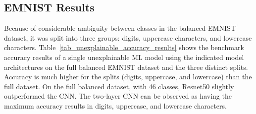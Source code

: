 \subsection{EMNIST Results}





Because of considerable ambiguity between classes in the balanced EMNIST
dataset, it was split into three groups: digits, uppercase characters, and
lowercase characters. Table~\ref{tab_unexplainable_accuracy_results} shows the
benchmark accuracy results of a single unexplainable ML model using the
indicated model architectures on the full balanced EMNIST dataset and the three
distinct splits. Accuracy is much higher for the splits (digits, uppercase, and
lowercase) than the full dataset. On the full balanced dataset, with 46 classes,
Resnet50 slightly outperformed the CNN. The two-layer CNN can be observed as
having the maximum accuracy results in digits, uppercase, and lowercase
characters.


